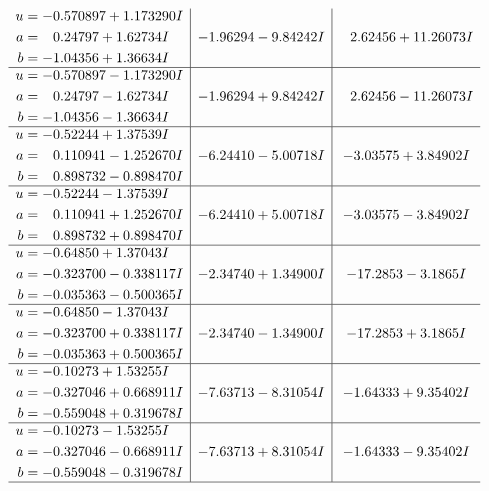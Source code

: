 \documentclass[1p]{elsarticle_modified}
\theoremstyle{definition}
\begin{document}
$$\begin{array}{c|c|c}
\begin{aligned}
u &= -0.570897 + 1.173290 I \\
a &= \phantom{-}0.24797 + 1.62734 I \\
b &= -1.04356 + 1.36634 I\end{aligned}
 & -1.96294 - 9.84242 I & \phantom{-}2.62456 + 11.26073 I \\ \hline\begin{aligned}
u &= -0.570897 - 1.173290 I \\
a &= \phantom{-}0.24797 - 1.62734 I \\
b &= -1.04356 - 1.36634 I\end{aligned}
 & -1.96294 + 9.84242 I & \phantom{-}2.62456 - 11.26073 I \\ \hline\begin{aligned}
u &= -0.52244 + 1.37539 I \\
a &= \phantom{-}0.110941 - 1.252670 I \\
b &= \phantom{-}0.898732 - 0.898470 I\end{aligned}
 & -6.24410 - 5.00718 I & -3.03575 + 3.84902 I \\ \hline\begin{aligned}
u &= -0.52244 - 1.37539 I \\
a &= \phantom{-}0.110941 + 1.252670 I \\
b &= \phantom{-}0.898732 + 0.898470 I\end{aligned}
 & -6.24410 + 5.00718 I & -3.03575 - 3.84902 I \\ \hline\begin{aligned}
u &= -0.64850 + 1.37043 I \\
a &= -0.323700 - 0.338117 I \\
b &= -0.035363 - 0.500365 I\end{aligned}
 & -2.34740 + 1.34900 I & -17.2853 - 3.1865 I \\ \hline\begin{aligned}
u &= -0.64850 - 1.37043 I \\
a &= -0.323700 + 0.338117 I \\
b &= -0.035363 + 0.500365 I\end{aligned}
 & -2.34740 - 1.34900 I & -17.2853 + 3.1865 I \\ \hline\begin{aligned}
u &= -0.10273 + 1.53255 I \\
a &= -0.327046 + 0.668911 I \\
b &= -0.559048 + 0.319678 I\end{aligned}
 & -7.63713 - 8.31054 I & -1.64333 + 9.35402 I \\ \hline\begin{aligned}
u &= -0.10273 - 1.53255 I \\
a &= -0.327046 - 0.668911 I \\
b &= -0.559048 - 0.319678 I\end{aligned}
 & -7.63713 + 8.31054 I & -1.64333 - 9.35402 I\\
 \hline 
 \end{array}$$\newpage\newpage\renewcommand{\arraystretch}{1}
\end{document}
